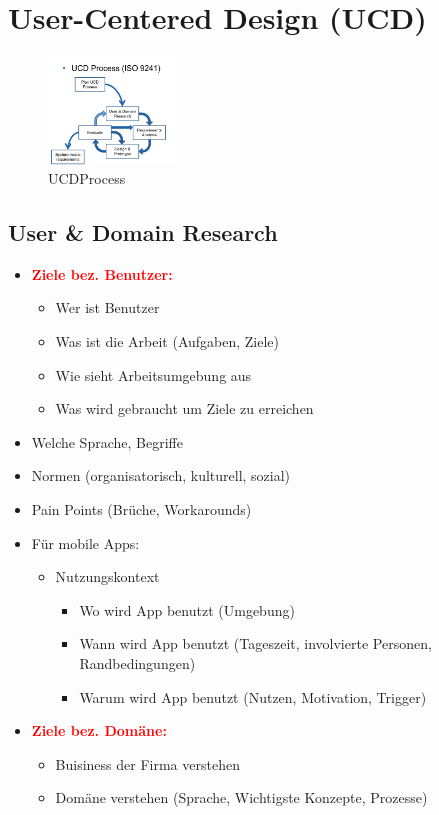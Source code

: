 \documentclass{article}
\begin{document}
\section{User-Centered Design (UCD)}

\begin{figure}[H]
\centering
\includegraphics[width=0.3\textwidth]{Resources/Images/UCD_Process.png}
\caption{\label{fig:UCDProcess} UCDProcess}
\end{figure}


\subsection{User \& Domain Research}
\begin{itemize}
	\item \textcolor{red} {\textbf{Ziele bez. Benutzer:}}
	\begin{itemize}
		\item Wer ist Benutzer
		\item Was ist die Arbeit (Aufgaben, Ziele)
		\item Wie sieht Arbeitsumgebung aus
		\item Was wird gebraucht um Ziele zu erreichen
	\end{itemize}
	\item Welche Sprache, Begriffe
	\item Normen (organisatorisch, kulturell, sozial)
	\item Pain Points (Brüche, Workarounds)
	\item Für mobile Apps:
	\begin{itemize}
		\item Nutzungskontext
		\begin{itemize}
			\item Wo wird App benutzt (Umgebung)
			\item Wann wird App benutzt (Tageszeit, involvierte Personen, Randbedingungen)
			\item Warum wird App benutzt (Nutzen, Motivation, Trigger)
		\end{itemize}
	\end{itemize}
	\item \textcolor{red} {\textbf{Ziele bez. Domäne:}}
	\begin{itemize}
		\item Buisiness der Firma verstehen
		\item Domäne verstehen (Sprache, Wichtigste Konzepte, Prozesse)
	\end{itemize}
	
\end{itemize}
\end{document}
